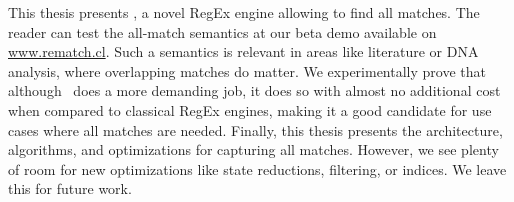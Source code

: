 This thesis presents \rematch, a novel RegEx engine allowing to find all matches.
The reader can test the all-match semantics at our beta demo available on \url{www.rematch.cl}.
Such a semantics is relevant in areas like literature or DNA analysis, where overlapping matches do matter. We experimentally prove that although \rematch\ does a more demanding job, it does so with almost no additional cost when compared to classical RegEx engines, making it a good candidate for use cases where all matches are needed.  Finally, this thesis presents the architecture, algorithms, and optimizations for capturing all matches. However, we see plenty of room for new optimizations like state reductions, filtering, or indices. We leave this for future work.

